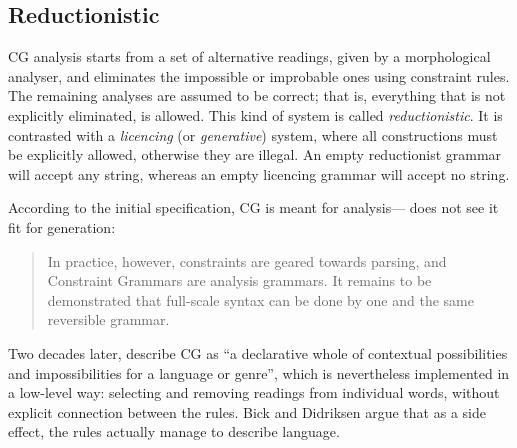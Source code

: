 \subsection{Reductionistic}\label{reductionist-vs.licencing}

CG analysis starts from a set of alternative readings, given by a morphological analyser,
and eliminates the impossible or improbable ones using constraint rules. 
The remaining analyses are assumed to be correct; that
is, everything that is not explicitly eliminated, is allowed. 
This kind of system is called \emph{reductionistic}. It is contrasted 
with a \emph{licencing} (or \emph{generative}) system, where all constructions must
be explicitly allowed, otherwise they are illegal. 
An empty reductionist grammar will accept any string, whereas an empty
licencing grammar will accept no string.




According to the initial specification, CG is meant for analysis---\cite{karlsson1995constraint} does not see it fit for generation:

\begin{quote}
In practice, however, constraints are geared towards parsing, and Constraint Grammars are analysis grammars. It remains to be demonstrated that full-scale syntax can be done by one and the same reversible grammar.
\end{quote}
\noindent Two decades later, \cite{bick2015} describe CG as ``a
declarative whole of contextual possibilities and impossibilities for
a language or genre'', which is nevertheless implemented in a
low-level way: selecting and removing readings from individual words,
without explicit connection between the rules. Bick and Didriksen
argue that as a side effect, the rules actually manage to describe language.

